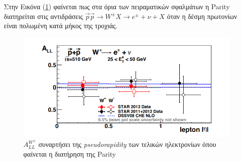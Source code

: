 Στην Εικόνα (\ref{fig4.20}) φαίνεται πως στα όρια των πειραματικών σφαλμάτων η Parity διατηρείται στις αντιδράσεις $\vec{p}\vec{p}\rightarrow W^\pm X\rightarrow e^\pm+\nu+X$ όταν η δέσμη πρωτονίων είναι πολωμένη κατά μήκος της τροχιάς.	
	
	\begin{figure}[h!]
		\centering
		\includegraphics[scale=0.7]{STAR_Results/ALL_parity_conservation}
		\caption{$A_{LL}^{W^\pm}$ συναρτήσει της \textit{pseudorapidity} των τελικών ηλεκτρονίων όπου φαίνεται η διατήρηση της Parity}
		\label{fig4.20}
	\end{figure}
	
	